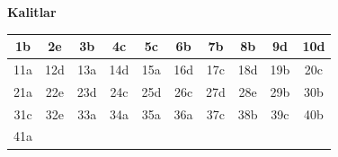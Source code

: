 \textbf{Kalitlar}

\begin{center}
\begin{tabular}{|c|c|c|c|c|c|c|c|c|c|}
\hline
1b & 2e & 3b & 4c & 5c & 6b & 7b & 8b & 9d & 10d \\
\hline
11a & 12d & 13a & 14d & 15a & 16d & 17c & 18d & 19b & 20c \\
\hline
21a & 22e & 23d & 24c & 25d & 26c & 27d & 28e & 29b & 30b \\
\hline
31c & 32e & 33a & 34a & 35a & 36a & 37c & 38b & 39c & 40b \\
\hline
41a & & & & & & & & & \\
\hline
\end{tabular}
\end{center}



